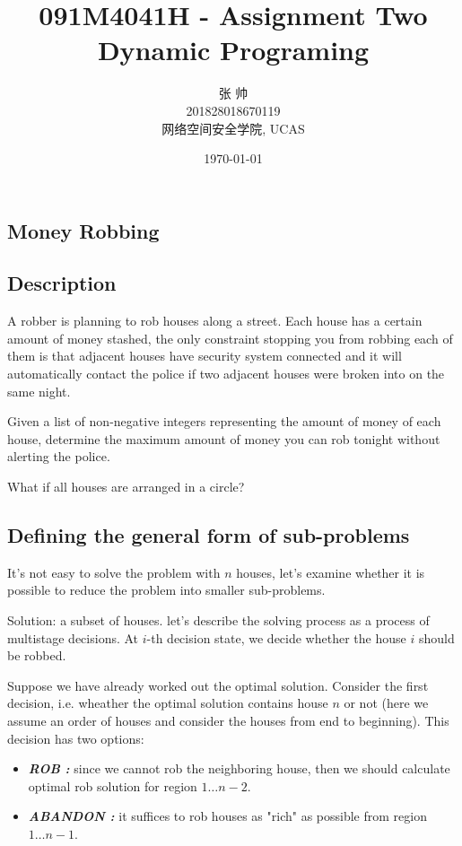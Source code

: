\documentclass[UTF8,a4paper,12pt]{article}
\title{091M4041H - Assignment Two\\Dynamic Programing}
\date{\today}
\author{张   帅\\201828018670119\\网络空间安全学院, UCAS}
\begin{document}
	\begin{CJK}{UTF8}{gkai}
		\maketitle
	\section{Money Robbing}
	\subsection{Description}
	
		A robber is planning to rob houses along a street. Each house has a certain amount of money stashed, the only constraint stopping you from robbing each of them is that adjacent houses have security system connected and it will automatically contact the police if two adjacent houses were broken into on the same night.
		
		Given a list of non-negative integers representing the amount of money of each house, determine the maximum amount of money you can rob tonight without alerting the police.
		
		What if all houses are arranged in a circle?
	
	\subsection{Defining the general form of sub-problems}
	
		It's not easy to solve the problem with $ n $ houses, let's examine whether it is possible to reduce the problem into smaller sub-problems.
	
		Solution: a subset of houses. let's describe the solving process as a process of multistage decisions. At $ i $-th decision state, we decide whether the house $ i $ should be robbed.
	
		Suppose we have already worked out the optimal solution. Consider the first decision, i.e. wheather the optimal solution contains house $ n $ or not (here we assume an order of houses and consider the houses from end to beginning). This decision has two options:

		\begin{itemize}
			\item \textbf{\textit{\small ROB :}} since we cannot rob the neighboring house, then we should calculate optimal rob solution for region $ 1 \dots n-2 $.
	
			\item \textbf{\textit{\small ABANDON :}} it suffices to rob houses as "rich" as possible from region $ 1 \dots n-1 $.
		\end{itemize}
	

\end{CJK}
\end{document}
